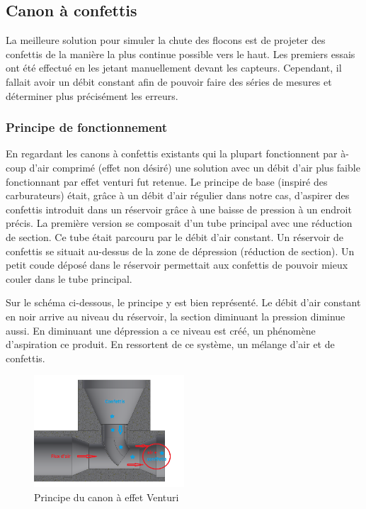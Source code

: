 \subsection{Canon à confettis}

La meilleure solution pour simuler la chute des flocons est de projeter des confettis de la manière la 
plus continue possible vers le haut. Les premiers essais ont été effectué en les jetant manuellement 
devant les capteurs. Cependant, il fallait avoir un débit constant afin de pouvoir faire des séries de
mesures et déterminer plus précisément les erreurs. 

\subsubsection{Principe de fonctionnement}

En regardant les canons à confettis existants qui la plupart fonctionnent par à-coup d’air comprimé 
(effet non désiré) une solution avec un débit d’air plus faible fonctionnant par effet venturi fut 
retenue. Le principe de base (inspiré des carburateurs) était, grâce à un débit d’air régulier dans 
notre cas, d’aspirer des confettis introduit dans un réservoir grâce à une baisse de pression à un 
endroit précis. La première version se composait d’un tube principal avec une réduction de section. 
Ce tube était parcouru par le débit d’air constant. Un réservoir de confettis se situait au-dessus 
de la zone de dépression (réduction de section). Un petit coude déposé dans le réservoir permettait 
aux confettis de pouvoir mieux couler dans le tube principal.\par 
Sur le schéma ci-dessous, le principe y est bien représenté. Le débit d’air constant en noir arrive 
au niveau du réservoir, la section diminuant la pression diminue aussi. En diminuant une dépression 
a ce niveau est créé, un phénomène d’aspiration ce produit. En ressortent de ce système, un mélange 
d’air et de confettis.

\begin{figure}[H]
    \centering
    \includegraphics[width=0.5\textwidth]{Images/photos_PGA/venturi_v1b.PNG}
    \caption{Principe du canon à effet Venturi}
    \label{fig:venturi}
\end{figure}

